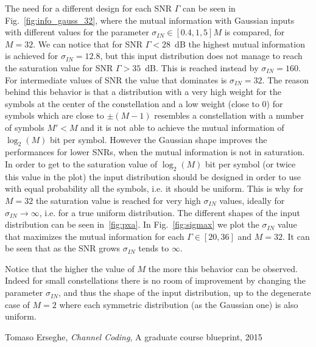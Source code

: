 \documentclass[10pt]{article}
\begin{document}
\clearpage

The need for a different design for each SNR $\Gamma$ can be seen in Fig.~\ref{fig:info_gauss_32}, where the mutual information with Gaussian inputs with different values for the parameter $\sigma_{IN} \in [0.4, 1, 5]M$ is compared, for $M=32$. We can notice that for SNR $\Gamma < 28$~dB the highest mutual information is achieved for $\sigma_{IN} = 12.8$, but this input distribution does not manage to reach the saturation value for SNR $\Gamma > 35$~dB. This is reached instead by $\sigma_{IN} = 160$. For intermediate values of SNR the value that dominates is $\sigma_{IN} = 32$. The reason behind this behavior is that a distribution with a very high weight for the symbols at the center of the constellation and a low weight (close to 0) for symbols which are close to $\pm(M-1)$ resembles a constellation with a number of symbols $M' < M$ and it is not able to achieve the mutual information of $\log_2(M)$ bit per symbol. However the Gaussian shape improves the performances for lower SNRs, when the mutual information is not in saturation. In order to get to the saturation value of $\log_2(M)$ bit per symbol (or twice this value in the plot) the input distribution should be designed in order to use with equal probability all the symbols, i.e. it should be uniform. This is why for $M = 32$ the saturation value is reached for very high $\sigma_{IN}$ values, ideally for $\sigma_{IN} \rightarrow \infty$, i.e. for a true uniform distribution. The different shapes of the input distribution can be seen in~\ref{fig:pxa}.
In Fig.~\ref{fig:sigmax} we plot the $\sigma_{IN}$ value that maximizes the mutual information for each $\Gamma \in [20, 36]$ and $M=32$. It can be seen that as the SNR grows $\sigma_{IN}$ tends to $\infty$.

Notice that the higher the value of $M$ the more this behavior can be observed. Indeed for small constellations there is no room of improvement by changing the parameter $\sigma_{IN}$, and thus the shape of the input distribution, up to the degenerate case of $M=2$ where each symmetric distribution (as the Gaussian one) is also uniform.

\begin{thebibliography}{10}

 Tomaso Erseghe, \emph{Channel Coding}, A graduate course blueprint, 2015

\end{thebibliography}
\end{document}
